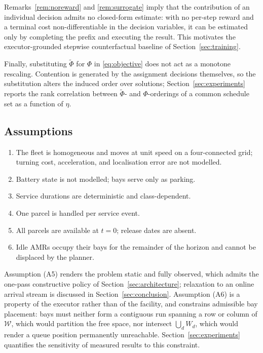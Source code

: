 \begin{remark}
\label{rem:rollout}
Remarks~\ref{rem:noreward} and \ref{rem:surrogate} imply that the
contribution of an individual decision admits no closed-form estimate: with
no per-step reward and a terminal cost non-differentiable in the decision
variables, it can be estimated only by completing the prefix and executing
the result. This motivates the executor-grounded stepwise counterfactual
baseline of Section~\ref{sec:training}.
\end{remark}

Finally, substituting $\tilde{\Phi}$ for $\Phi$ in \eqref{eq:objective} does
not act as a monotone rescaling. Contention is generated by the assignment
decisions themselves, so the substitution alters the induced order over
solutions; Section~\ref{sec:experiments} reports the rank correlation
between $\tilde{\Phi}$- and $\Phi$-orderings of a common schedule set as a
function of $\eta$.

\subsection{Assumptions}
\label{sec:assumptions}

\begin{enumerate}[label=(A\arabic*),leftmargin=2.6em]
\item The fleet is homogeneous and moves at unit speed on a four-connected
grid; turning cost, acceleration, and localisation error are not modelled.
\item Battery state is not modelled; bays serve only as parking.
\item Service durations are deterministic and class-dependent.
\item One parcel is handled per service event.
\item All parcels are available at $t=0$; release dates are absent.
\item Idle AMRs occupy their bays for the remainder of the horizon and
cannot be displaced by the planner.
\end{enumerate}

Assumption (A5) renders the problem static and fully observed, which admits
the one-pass constructive policy of Section~\ref{sec:architecture};
relaxation to an online arrival stream is discussed in
Section~\ref{sec:conclusion}. Assumption (A6) is a property of the executor
rather than of the facility, and constrains admissible bay placement: bays
must neither form a contiguous run spanning a row or column of $\mathcal{W}$,
which would partition the free space, nor intersect $\bigcup_{d}W_d$, which
would render a queue position permanently unreachable. Section~\ref{sec:experiments}
quantifies the sensitivity of measured results to this constraint.

